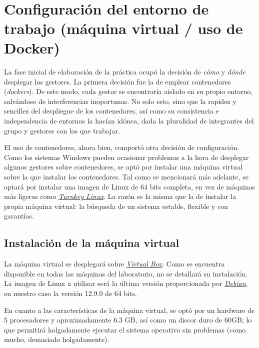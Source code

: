 \documentclass{article}
\begin{document}
\\
\section{Configuración del entorno de trabajo (máquina virtual / uso de Docker)}

La fase inicial de elaboración de la práctica ocupó la decisión de \textit{cómo} y \textit{dónde} desplegar los gestores. La primera decisión fue la de emplear contenedores (\textit{dockers}). De este modo, cada gestor se encontraría aislado en su propio entorno, salvándose de interferencias inoportunas. No solo esto, sino que la rapidez y sencillez del despliegue de los contenedores, así como su consistencia e independencia de entornos la hacían idónea, dada la pluralidad de integrantes del grupo y gestores con los que trabajar.

El uso de contenedores, ahora bien, comportó otra decisión de configuración. Como los sistemas Windows pueden ocasionar problemas a la hora de desplegar algunos gestores sobre contenedores, se optó por instalar una máquina virtual sobre la que instalar los contenedores. Tal como se mencionará más adelante, se optará por instalar una imagen de Linux de 64 bits completa, en vez de máquinas más ligeras como \textit{\textcolor{blue}{\href{https://www.turnkeylinux.org/}{Turnkey Linux}}}. La razón es la misma que la de instalar la propia máquina virtual: la búsqueda de un sistema estable, flexible y con garantías.

\subsection{Instalación de la máquina virtual}\label{subsec:Instalación de la máquina virtual}
La máquina virtual se desplegará sobre   \textit{\textcolor{blue}{\href{https://www.oracle.com/es/virtualization/virtualbox/}{Virtual Box}}}. Como se encuentra disponible en todas las máquinas del laboratorio, no se detallará su instalación. La imagen de Linux a utilizar será la última versión proporcionada por \textit{\textcolor{blue}{\href{https://www.debian.org/index.es.html}{Debian}}}, en nuestro caso la versión 12.9.0 de 64 bits.

En cuanto a las características de la máquina virtual, se optó por un hardware de 5 procesadores y aproximadamente 6.3 GB, así como un  discor duro de 60GB; lo que permitirá holgadamente ejecutar el sistema operativo sin problemas (como mucho, demasiado holgadamente).
\end{document}
